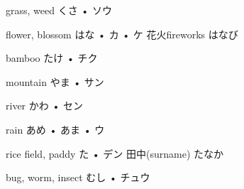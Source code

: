 



\setcounter{cardnum}{33}

		{grass, weed}
		{くさ • ソウ}
		{}{}
		{}{}
		{}{}
		{}{}
		{}{}

		{flower, blossom}
		{はな • カ • ケ}
		{花火}{fireworks はなび}
		{}{}
		{}{}
		{}{}
		{}{}

		{bamboo}
		{たけ • チク}
		{}{}
		{}{}
		{}{}
		{}{}
		{}{}

		{mountain}
		{やま • サン}
		{}{}
		{}{}
		{}{}
		{}{}
		{}{}

		{river}
		{かわ • セン}
		{}{}
		{}{}
		{}{}
		{}{}
		{}{}

		{rain}
		{あめ • あま • ウ}
		{}{}
		{}{}
		{}{}
		{}{}
		{}{}

		{rice field, paddy}
		{た • デン}
		{田中}{(surname) たなか}
		{}{}
		{}{}
		{}{}
		{}{}

		{bug, worm, insect}
		{むし • チュウ}
		{}{}
		{}{}
		{}{}
		{}{}
		{}{}

